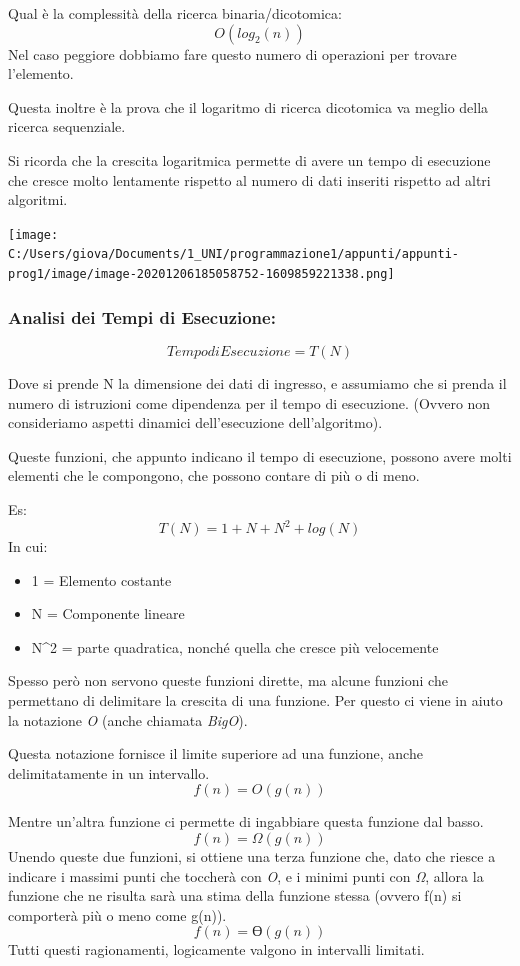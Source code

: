 \documentclass[
  paper=a4,
  oneside  ,captions=tableheading
]{scrbook}
\providecommand{\tightlist}{%
  \setlength{\itemsep}{0pt}\setlength{\parskip}{0pt}}
\begin{document}
Qual è la complessità della ricerca binaria/dicotomica: \[
O(log_2(n))
\] Nel caso peggiore dobbiamo fare questo numero di operazioni per
trovare l'elemento.

Questa inoltre è la prova che il logaritmo di ricerca dicotomica va
meglio della ricerca sequenziale.

Si ricorda che la crescita logaritmica permette di avere un tempo di
esecuzione che cresce molto lentamente rispetto al numero di dati
inseriti rispetto ad altri algoritmi.

\texttt{[image: C:/Users/giova/Documents/1\_UNI/programmazione1/appunti/appunti-prog1/image/image-20201206185058752-1609859221338.png]}

\hypertarget{analisi-dei-tempi-di-esecuzione}{%
\subsubsection{Analisi dei Tempi di
Esecuzione:}\label{analisi-dei-tempi-di-esecuzione}}

\[
Tempo di Esecuzione = T(N)
\]

Dove si prende N la dimensione dei dati di ingresso, e assumiamo che si
prenda il numero di istruzioni come dipendenza per il tempo di
esecuzione. (Ovvero non consideriamo aspetti dinamici dell'esecuzione
dell'algoritmo).

Queste funzioni, che appunto indicano il tempo di esecuzione, possono
avere molti elementi che le compongono, che possono contare di più o di
meno.

Es: \[
T(N) = 1 + N + N^2 + log(N)
\] In cui:

\begin{itemize}
\tightlist
\item
  1 = Elemento costante
\item
  N = Componente lineare
\item
  N\^{}2 = parte quadratica, nonché quella che cresce più velocemente
\end{itemize}

Spesso però non servono queste funzioni dirette, ma alcune funzioni che
permettano di delimitare la crescita di una funzione. Per questo ci
viene in aiuto la notazione \emph{O} (anche chiamata \emph{BigO}).

Questa notazione fornisce il limite superiore ad una funzione, anche
delimitatamente in un intervallo. \[
f(n) = O(g(n))
\]

Mentre un'altra funzione ci permette di ingabbiare questa funzione dal
basso. \[
f(n) = Ω(g(n))
\] Unendo queste due funzioni, si ottiene una terza funzione che, dato
che riesce a indicare i massimi punti che toccherà con \emph{O}, e i
minimi punti con \emph{Ω}, allora la funzione che ne risulta sarà una
stima della funzione stessa (ovvero f(n) si comporterà più o meno come
g(n)). \[
f(n) = Ɵ(g(n))
\] Tutti questi ragionamenti, logicamente valgono in intervalli
limitati.
\end{document}
